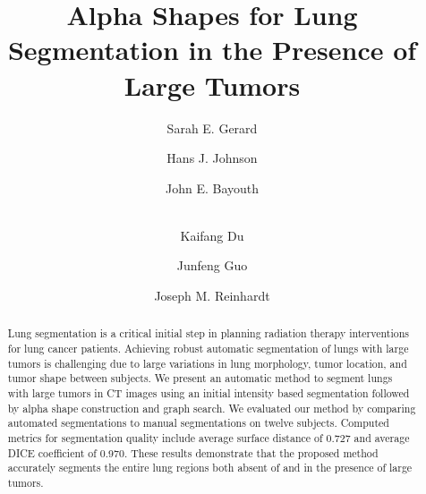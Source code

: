 \documentclass{llncs}
\begin{document}
%
\frontmatter          %
%
\pagestyle{headings}  %
%

%
%

\mainmatter              %
%
\title{Alpha Shapes for Lung Segmentation in the Presence of Large Tumors}
%
%
\author{
Sarah E. Gerard \and
Hans J. Johnson \and
John E. Bayouth \and\\
Kaifang Du \and
Junfeng Guo \and
Joseph M. Reinhardt
}
%
%
%


\maketitle              %


\begin{abstract}
Lung segmentation is a critical initial step in planning radiation therapy interventions for lung cancer patients. Achieving robust automatic segmentation of lungs with large tumors is challenging due to large variations in lung morphology, tumor location, and tumor shape between subjects. We present an automatic method to segment lungs with large tumors in CT images using an initial intensity based segmentation followed by alpha shape construction and graph search. We evaluated our method by comparing automated segmentations to manual segmentations on twelve subjects. Computed metrics for segmentation quality include average surface distance of 0.727 and average DICE coefficient of 0.970. These results demonstrate that the proposed method accurately segments the entire lung regions both absent of and in the presence of large tumors. 
\end{abstract}
%
\end{document}
